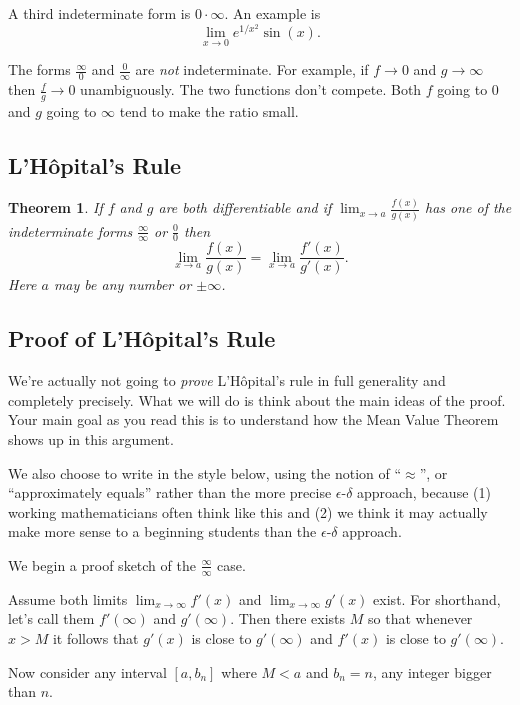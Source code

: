 \documentclass[11pt]{book}
\makeatletter
\newcounter{error}[chapter]
\newcommand{\hilight@DoHighlight}{
  \fill [ decoration = {random steps, amplitude=1pt, segment length=15pt}
        , outer sep = -15pt, inner sep = 0pt, decorate
        , every highlighter, this highlighter ]
        ($(begin highlight)+(0,8pt)$) rectangle ($(end highlight)+(0,-3pt)$) ;
}
\newcommand{\hilight@BeginHighlight}{
  \coordinate (begin highlight) at (0,0) ;
}
\newcommand{\hilight@EndHighlight}{
  \coordinate (end highlight) at (0,0) ;
}
\DeclareRobustCommand*\hilight[1][]{%
  \tikzset{this highlighter/.style={#1}}%
  \SOUL@setup
  \def\SOUL@preamble{%
    \begin{tikzpicture}[overlay, remember picture]
      \hilight@BeginHighlight
      \hilight@EndHighlight
    \end{tikzpicture}%
  }%
  \def\SOUL@postamble{%
    \begin{tikzpicture}[overlay, remember picture]
      \hilight@EndHighlight
      \hilight@DoHighlight
    \end{tikzpicture}%
  }%
  \def\SOUL@everyhyphen{%
    \discretionary{%
      \SOUL@setkern\SOUL@hyphkern
      \SOUL@sethyphenchar
      \tikz[overlay, remember picture] \hilight@EndHighlight ;%
    }{%
    }{%
      \SOUL@setkern\SOUL@charkern
    }%
  }%
  \def\SOUL@everyexhyphen##1{%
    \SOUL@setkern\SOUL@hyphkern
    \hbox{##1}%
    \discretionary{%
      \tikz[overlay, remember picture] \hilight@EndHighlight ;%
    }{%
    }{%
      \SOUL@setkern\SOUL@charkern
    }%
  }%
  \def\SOUL@everysyllable{%
    \begin{tikzpicture}[overlay, remember picture]
      \path let \p0 = (begin highlight), \p1 = (0,0) in \pgfextra
        \global\hilight@previous=\y0
        \global\hilight@current =\y1
      \endpgfextra (0,0) ;
      \ifdim\hilight@current < \hilight@previous
        \hilight@DoHighlight
        \hilight@BeginHighlight
      \fi
    \end{tikzpicture}%
    \the\SOUL@syllable
    \tikz[overlay, remember picture] \hilight@EndHighlight ;%
  }%
  \SOUL@
}
\newtheorem{theorem}{Theorem}
\numberwithin{example}{chapter}
\makeatother
\begin{document}
A third indeterminate form is $0\cdot \infty$.  An example is 
$$\lim_{x\to 0}e^{1/x^2}\sin(x).$$


\begin{error}
The forms $\frac{\infty}{0}$ and $\frac{0}{\infty}$ are \emph{not} indeterminate.  For example, if $f\to 0$ and $g\to \infty$ then $\frac{f}{g}\to 0$ unambiguously.  The two functions don't compete.  Both $f$ going to 0 and $g$ going to $\infty$ tend to make the ratio small.
\end{error}

\subsection{L'H\^{o}pital's Rule}


\begin{theorem}
If $f$ and $g$ are both differentiable and if $\lim_{x\to a} \frac{f(x)}{g(x)}$ has one of the indeterminate forms $\frac{\infty}{\infty}$ or $\frac{0}{0}$ then 
$$\lim_{x\to a} \frac{f(x)}{g(x)} = \lim_{x\to a} \frac{f'(x)}{g'(x)}.$$
Here $a$ may be any number or $\pm\infty$.
\end{theorem}

\subsection{Proof of L'H\^{o}pital's Rule}

We're actually not going to \emph{prove} L'H\^{o}pital's rule in full generality and completely precisely.  What we will do is think about the main ideas of the proof.  Your main goal as you read this is to \hilight{understand how the Mean Value Theorem shows up in this argument}.

We also choose to write in the style below, using the notion of ``$\approx$'', or ``approximately equals'' rather than the more precise $\epsilon$-$\delta$ approach, because (1) working mathematicians often think like this and (2) we think it may actually make more sense to a beginning students than the $\epsilon$-$\delta$ approach.

We begin a proof sketch of the $\frac{\infty}{\infty}$ case.

Assume both limits $\lim_{x\to \infty}f'(x)$ and $\lim_{x\to \infty}g'(x)$ exist.  For shorthand, let's call them $f'(\infty)$ and $g'(\infty)$.  Then there exists $M$ so that whenever $x>M$ it follows that $g'(x)$ is close to $g'(\infty)$ and $f'(x)$ is close to $g'(\infty)$.

Now consider any interval $[a,b_n]$ where $M<a$ and  $b_n=n$, any integer bigger than $n$.    
\end{document}
